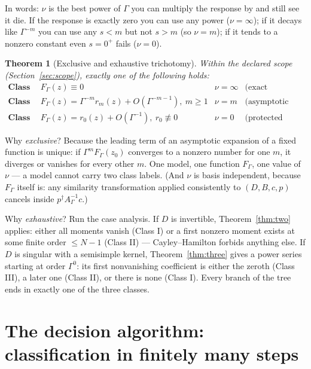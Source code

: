 \documentclass[11pt]{article}
\newtheorem{theorem}{Theorem}
\begin{document}
In words: $\nu$ is the best power of $\Gamma$ you can multiply the response
by and still see it die.  If the response is exactly zero you can use any
power ($\nu=\infty$); if it decays like $\Gamma^{-m}$ you can use any
$s<m$ but not $s>m$ (so $\nu=m$); if it tends to a nonzero constant even
$s=0^+$ fails ($\nu=0$).

\begin{theorem}[Exclusive and exhaustive trichotomy]
Within the declared scope (Section~\ref{sec:scope}), exactly one of the
following holds:
\[
\begin{array}{llll}
\textbf{Class I} & F_\Gamma(z)\equiv0 & \nu=\infty
& \text{(exact structural no-go)}\\[2pt]
\textbf{Class II} & F_\Gamma(z)=\Gamma^{-m}r_m(z)+O(\Gamma^{-m-1}),\ m\ge1 & \nu=m
& \text{(asymptotic suppression)}\\[2pt]
\textbf{Class III} & F_\Gamma(z)=r_0(z)+O(\Gamma^{-1}),\ r_0\not\equiv0 & \nu=0
& \text{(protected survival)}
\end{array}
\]
\end{theorem}

Why \emph{exclusive}?  Because the leading term of an asymptotic expansion of
a fixed function is unique: if $\Gamma^{m}F_\Gamma(z_0)$ converges to a
nonzero number for one $m$, it diverges or vanishes for every other $m$.
One model, one function $F_\Gamma$, one value of $\nu$ --- a model cannot
carry two class labels.  (And $\nu$ is basis independent, because $F_\Gamma$
itself is: any similarity transformation applied consistently to
$(D,B,c,p)$ cancels inside $p^\dagger A_\Gamma^{-1}c$.)

Why \emph{exhaustive}?  Run the case analysis.  If $D$ is invertible,
Theorem~\ref{thm:two} applies: either all moments vanish (Class I) or a
first nonzero moment exists at some finite order $\le N-1$ (Class II) ---
Cayley--Hamilton forbids anything else.  If $D$ is singular with a semisimple
kernel, Theorem~\ref{thm:three} gives a power series starting at order
$\Gamma^0$: its first nonvanishing coefficient is either the zeroth
(Class III), a later one (Class II), or there is none (Class I).  Every
branch of the tree ends in exactly one of the three classes.

\section{The decision algorithm: classification in finitely many steps}
\label{sec:algorithm}
\end{document}
